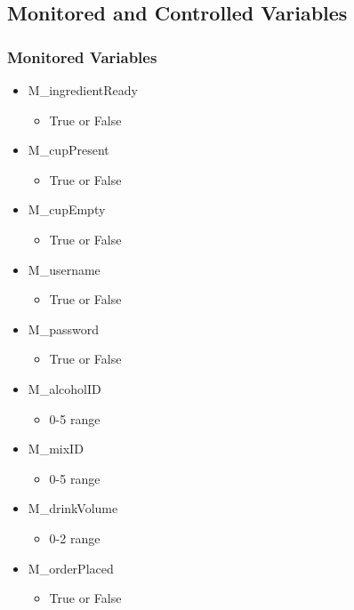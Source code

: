 \documentclass{article}
\begin{document}
\subsection{Monitored and Controlled Variables}
\subsubsection{Monitored Variables} %
    \begin{itemize}
        \item M\_ingredientReady
        \begin{itemize}
            \item True or False
        \end{itemize}
        \item M\_cupPresent
        \begin{itemize}
            \item True or False
        \end{itemize}
        \item M\_cupEmpty
        \begin{itemize}
            \item True or False
        \end{itemize}
        \item M\_username
        \begin{itemize}
            \item True or False
        \end{itemize}
        \item M\_password
        \begin{itemize}
            \item True or False
        \end{itemize}
        \item M\_alcoholID
        \begin{itemize}
            \item 0-5 range
        \end{itemize}
        \item M\_mixID
        \begin{itemize}
            \item 0-5 range
        \end{itemize}
        \item M\_drinkVolume
        \begin{itemize}
            \item 0-2 range
        \end{itemize}
        \item M\_orderPlaced
        \begin{itemize}
            \item True or False
        \end{itemize}
    \end{itemize}
    
\end{document}
